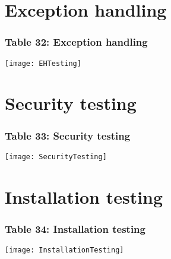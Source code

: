 \begin{figure}
\section{Exception handling}
\subsubsection{Table 32: Exception handling}
\centering
\texttt{[image: EHTesting]}
\end{figure}

\begin{figure}
\section{Security testing}
\subsubsection{Table 33: Security testing}
\centering
\texttt{[image: SecurityTesting]}
\end{figure}

\begin{figure}[t]
\section{Installation testing}
\subsubsection{Table 34: Installation testing}
\centering
\texttt{[image: InstallationTesting]}
\end{figure}


